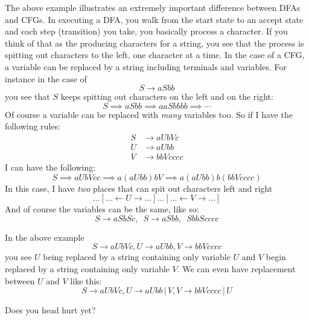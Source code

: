 \newpage
The above example illustrates an extremely important difference between DFAs
and CFGs.
In executing a DFA, you walk from the start state to an accept state and
each step (transition) you take, you basically process a character.
If you think of that as the producing characters for a string, you see that
the process is spitting out characters to the left, one character at a time.
In the case of a CFG, a variable can be replaced by a string including
terminals and variables.
For instance in the case of 
\[
S \rightarrow a S bb
\]
you see that $S$ keeps spitting out characters on the left and on the right:
\[
S \implies aSbb \implies aaSbbbb \implies \cdots
\]
Of course a variable can be replaced with \textit{many} variables too.
So if I have the following rules:
\begin{align*}
S &\rightarrow aUbVc \\
U &\rightarrow aUbb \\
V &\rightarrow bbVcccc
\end{align*}
I can have the following:
\[
S
\implies aUbVcc
\implies a(aUbb)bV
\implies a(aUbb)b(bbVcccc)
\]
In this case, I have \textit{ two} places that can spit out characters left
and right
\[
...[... \leftarrow U \rightarrow ...]...[...\leftarrow V \rightarrow ...]
\]
And of course the variables can be the same, like so:
\[
S \rightarrow aSbSc, \,\,\, S \rightarrow aSbb, \,\,\, S bbScccc
\]

In the above example
\[
S \rightarrow aUbVc, U \rightarrow aUbb, V \rightarrow bbVcccc
\]
you see $U$ being replaced by a string containing only variable $U$
and $V$ begin replaced by a string containing only variable $V$.
We can even have replacement between $U$ and $V$ like this:
\[
S \rightarrow aUbVc, U \rightarrow aUbb\,|\, V, V \rightarrow bbVcccc\,|\, U
\]

Does you head hurt yet?




